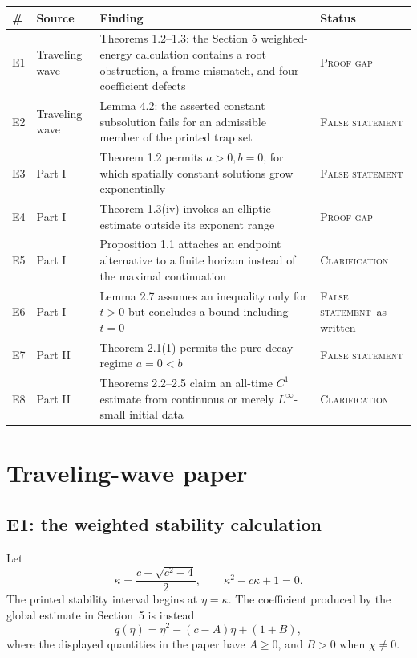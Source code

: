 \documentclass[11pt]{article}
\newcommand{\False}{\textsc{False statement}}
\newcommand{\Gap}{\textsc{Proof gap}}
\newcommand{\Clarify}{\textsc{Clarification}}
\begin{document}
\begin{center}
\renewcommand{\arraystretch}{1.18}
\begin{longtable}{@{}L{0.05\textwidth}L{0.15\textwidth}L{0.44\textwidth}L{0.25\textwidth}@{}}
\toprule
\# & Source & Finding & Status\\
\midrule
\endhead
E1 & Traveling wave & Theorems 1.2--1.3: the Section 5 weighted-energy
  calculation contains a root obstruction, a frame mismatch, and four
  coefficient defects & \Gap\\
E2 & Traveling wave & Lemma 4.2: the asserted constant subsolution fails for
  an admissible member of the printed trap set & \False\\
E3 & Part I & Theorem 1.2 permits \(a>0,b=0\), for which spatially constant
  solutions grow exponentially & \False\\
E4 & Part I & Theorem 1.3(iv) invokes an elliptic estimate outside its
  exponent range & \Gap\\
E5 & Part I & Proposition 1.1 attaches an endpoint alternative to a finite
  horizon instead of the maximal continuation & \Clarify\\
E6 & Part I & Lemma 2.7 assumes an inequality only for \(t>0\) but concludes
  a bound including \(t=0\) & \False\ as written\\
E7 & Part II & Theorem 2.1(1) permits the pure-decay regime \(a=0<b\) &
  \False\\
E8 & Part II & Theorems 2.2--2.5 claim an all-time \(C^1\) estimate from
  continuous or merely \(L^\infty\)-small initial data & \Clarify\\
\bottomrule
\end{longtable}
\end{center}

\section{Traveling-wave paper}

\subsection{E1: the weighted stability calculation}

Let
\[
  \kappa=\frac{c-\sqrt{c^2-4}}2,
  \qquad \kappa^2-c\kappa+1=0.
\]
The printed stability interval begins at \(\eta=\kappa\).  The coefficient
produced by the global estimate in Section~5 is instead
\begin{equation}
  q(\eta)=\eta^2-(c-A)\eta+(1+B),                       \label{eq:q}
\end{equation}
where the displayed quantities in the paper have \(A\ge0\), and \(B>0\)
when \(\chi\ne0\).
\end{document}
